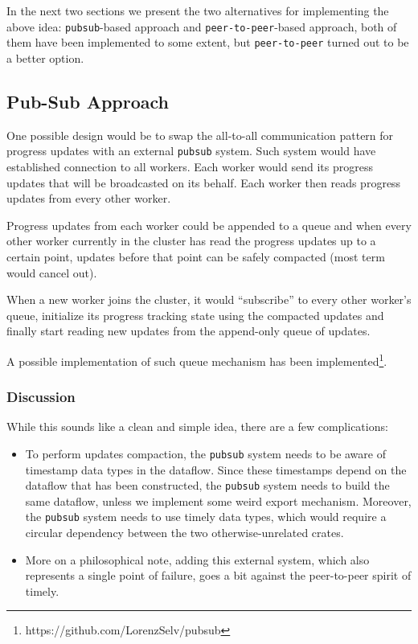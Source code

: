 \documentclass[12pt]{extarticle}
\begin{document}
In the next two sections we present the two alternatives for implementing the above idea:
\verb|pubsub|-based approach and \verb|peer-to-peer|-based approach, both of them
have been implemented to some extent, but \verb|peer-to-peer| turned out to be a better option.

\subsection{Pub-Sub Approach}

One possible design would be to swap the all-to-all communication pattern for progress updates
with an external \verb|pubsub| system. Such system would have established connection to all workers.
Each worker would send its progress updates that will be broadcasted on its behalf. Each worker
then reads progress updates from every other worker.

Progress updates from each worker could be appended to a queue and when every other worker currently
in the cluster has read the progress updates up to a certain point, updates before that point
can be safely compacted (most term would cancel out).

When a new worker joins the cluster, it would ``subscribe'' to every other worker's queue,
initialize its progress tracking state using the compacted updates and finally start reading
new updates from the append-only queue of updates.

A possible implementation of such queue mechanism has been implemented\footnote{https://github.com/LorenzSelv/pubsub}.

\subsubsection{Discussion}

While this sounds like a clean and simple idea, there are a few complications:
\begin{itemize}
    \item To perform updates compaction, the \verb|pubsub| system needs to be aware of timestamp
        data types in the dataflow. Since these timestamps depend on the dataflow that has been constructed,
        the \verb|pubsub| system needs to build the same dataflow, unless we implement some weird export
        mechanism. Moreover, the \verb|pubsub| system needs to use timely data types, which would require
        a circular dependency between the two otherwise-unrelated crates.

    \item More on a philosophical note, adding this external system, which also represents a single point of
        failure, goes a bit against the peer-to-peer spirit of timely.

\end{itemize}
\end{document}
